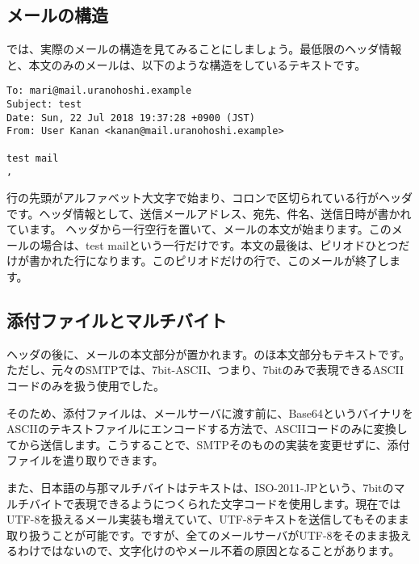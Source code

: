 \subsection{メールの構造}
では、実際のメールの構造を見てみることにしましょう。最低限のヘッダ情報と、本文のみのメールは、以下のような構造をしているテキストです。

\begin{verbatim}
To: mari@mail.uranohoshi.example
Subject: test
Date: Sun, 22 Jul 2018 19:37:28 +0900 (JST)
From: User Kanan <kanan@mail.uranohoshi.example>

test mail
,
\end{verbatim}

行の先頭がアルファベット大文字で始まり、コロンで区切られている行がヘッダです。ヘッダ情報として、送信メールアドレス、宛先、件名、送信日時が書かれています。
ヘッダから一行空行を置いて、メールの本文が始まります。このメールの場合は、test mailという一行だけです。本文の最後は、ピリオドひとつだけが書かれた行になります。このピリオドだけの行で、このメールが終了します。




\subsection{添付ファイルとマルチバイト}
ヘッダの後に、メールの本文部分が置かれます。のほ本文部分もテキストです。ただし、元々のSMTPでは、7bit-ASCII、つまり、7bitのみで表現できるASCIIコードのみを扱う使用でした。

そのため、添付ファイルは、メールサーバに渡す前に、Base64というバイナリをASCIIのテキストファイルにエンコードする方法で、ASCIIコードのみに変換してから送信します。こうすることで、SMTPそのものの実装を変更せずに、添付ファイルを遣り取りできます。

また、日本語の与那マルチバイトはテキストは、ISO-2011-JPという、7bitのマルチバイトで表現できるようにつくられた文字コードを使用します。現在ではUTF-8を扱えるメール実装も増えていて、UTF-8テキストを送信してもそのまま取り扱うことが可能です。ですが、全てのメールサーバがUTF-8をそのまま扱えるわけではないので、文字化けのやメール不着の原因となることがあります。

